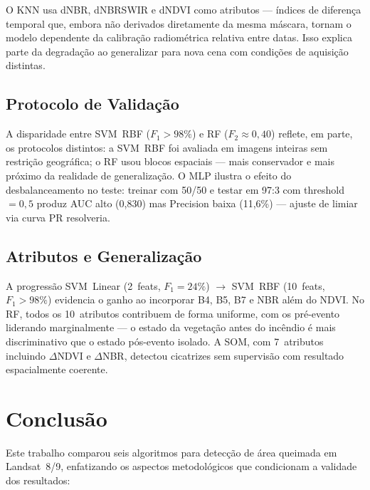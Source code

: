 \documentclass[conference]{IEEEtran}
\begin{document}
O KNN usa dNBR, dNBRSWIR e dNDVI como atributos — índices de diferença
temporal que, embora não derivados diretamente da mesma máscara, tornam
o modelo dependente da calibração radiométrica relativa entre datas.
Isso explica parte da degradação ao generalizar para nova cena com
condições de aquisição distintas.

\subsection{Protocolo de Validação}

A disparidade entre SVM~RBF ($F_1 > 98\%$) e RF ($F_2 \approx 0{,}40$)
reflete, em parte, os protocolos distintos: a SVM~RBF foi avaliada em
imagens inteiras sem restrição geográfica; o RF usou blocos espaciais —
mais conservador e mais próximo da realidade de generalização. O MLP
ilustra o efeito do desbalanceamento no teste: treinar com 50/50 e
testar em 97:3 com threshold~$= 0{,}5$ produz AUC alto (0,830) mas
Precision baixa (11,6\%) — ajuste de limiar via curva PR resolveria.

\subsection{Atributos e Generalização}

A progressão SVM~Linear (2~feats, $F_1=24\%$) $\to$ SVM~RBF (10~feats,
$F_1 > 98\%$) evidencia o ganho ao incorporar B4, B5, B7 e NBR além do
NDVI. No RF, todos os 10~atributos contribuem de forma uniforme, com
os pré-evento liderando marginalmente — o estado da vegetação antes do
incêndio é mais discriminativo que o estado pós-evento isolado. A SOM,
com 7~atributos incluindo $\Delta$NDVI e $\Delta$NBR, detectou
cicatrizes sem supervisão com resultado espacialmente coerente.

\section{Conclusão}

Este trabalho comparou seis algoritmos para detecção de área queimada em
Landsat~8/9, enfatizando os aspectos metodológicos que condicionam a
validade dos resultados:
\end{document}
